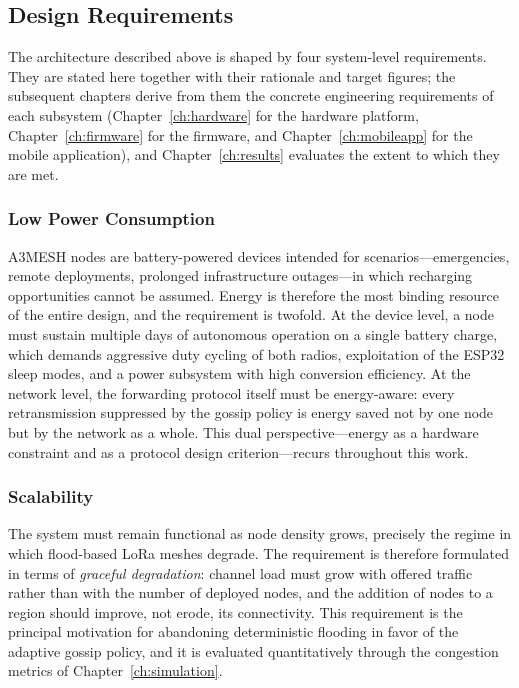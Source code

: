 \documentclass[english,bachelor]{tfgitic}[2026/01/22]
\begin{document}
\subsection{Design Requirements}
\label{sec:design_requirements}
The architecture described above is shaped by four system-level requirements. They are stated here together with their rationale and target figures; the subsequent chapters derive from them the concrete engineering requirements of each subsystem (Chapter~\ref{ch:hardware} for the hardware platform, Chapter~\ref{ch:firmware} for the firmware, and Chapter~\ref{ch:mobileapp} for the mobile application), and Chapter~\ref{ch:results} evaluates the extent to which they are met.

\subsubsection{Low Power Consumption}
\label{subsec:req_power}

A3MESH nodes are battery-powered devices intended for scenarios---emergencies, remote deployments, prolonged infrastructure outages---in which recharging opportunities cannot be assumed. Energy is therefore the most binding resource of the entire design, and the requirement is twofold. At the device level, a node must sustain multiple days of autonomous operation on a single battery charge, which demands aggressive duty cycling of both radios, exploitation of the ESP32 sleep modes, and a power subsystem with high conversion efficiency. At the network level, the forwarding protocol itself must be energy-aware: every retransmission suppressed by the gossip policy is energy saved not by one node but by the network as a whole. This dual perspective---energy as a hardware constraint and as a protocol design criterion---recurs throughout this work.

\subsubsection{Scalability}
\label{subsec:req_scalability}

The system must remain functional as node density grows, precisely the regime in which flood-based LoRa meshes degrade. The requirement is therefore formulated in terms of \emph{graceful degradation}: channel load must grow with offered traffic rather than with the number of deployed nodes, and the addition of nodes to a region should improve, not erode, its connectivity. This requirement is the principal motivation for abandoning deterministic flooding in favor of the adaptive gossip policy, and it is evaluated quantitatively through the congestion metrics of Chapter~\ref{ch:simulation}.
\end{document}

